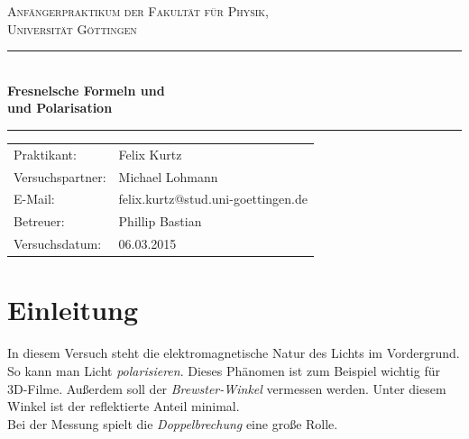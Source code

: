 \documentclass[12pt,a4paper,titlepage,headinclude,bibtotoc]{scrartcl}
\begin{document}
\begin{titlepage}
\centering
\textsc{\Large Anfängerpraktikum der Fakultät für
  Physik,\\[1.5ex] Universität Göttingen}

\vspace*{4.2cm}

\rule{\textwidth}{1pt}\\[0.5cm]
{\huge \bfseries
  Fresnelsche Formeln und\\[1.5ex]
  und Polarisation}\\[0.5cm]
\rule{\textwidth}{1pt}

\vspace*{3.0cm}

\begin{Large}
\begin{tabular}{ll}
Praktikant:
 	&  Felix Kurtz\\
Versuchspartner:
 	&  Michael Lohmann\\

E-Mail: 
	&  felix.kurtz@stud.uni-goettingen.de\\
	
 Betreuer: & Phillip Bastian\\
 Versuchsdatum: &  06.03.2015\\
\end{tabular}
\end{Large}

\vspace*{1.8cm}

\begin{Large}
\end{Large}

\end{titlepage}

\tableofcontents

\newpage

\section{Einleitung}
\label{sec:einleitung}
In diesem Versuch steht die elektromagnetische Natur des Lichts im Vordergrund.
So kann man Licht \emph{polarisieren}.
Dieses Phänomen ist zum Beispiel wichtig für 3D-Filme.
Außerdem soll der \emph{Brewster-Winkel} vermessen werden.
Unter diesem Winkel ist der reflektierte Anteil minimal.\\
Bei der Messung spielt die \emph{Doppelbrechung} eine große Rolle.
\end{document}
